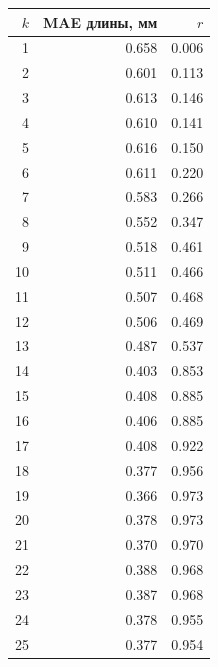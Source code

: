 \begin{tabular}{@{}rrr@{}}
\toprule
$k$ & MAE длины, мм & $r$ \\
\midrule
1 & \num{0.658} & \num{0.006} \\
2 & \num{0.601} & \num{0.113} \\
3 & \num{0.613} & \num{0.146} \\
4 & \num{0.610} & \num{0.141} \\
5 & \num{0.616} & \num{0.150} \\
6 & \num{0.611} & \num{0.220} \\
7 & \num{0.583} & \num{0.266} \\
8 & \num{0.552} & \num{0.347} \\
9 & \num{0.518} & \num{0.461} \\
10 & \num{0.511} & \num{0.466} \\
11 & \num{0.507} & \num{0.468} \\
12 & \num{0.506} & \num{0.469} \\
13 & \num{0.487} & \num{0.537} \\
14 & \num{0.403} & \num{0.853} \\
15 & \num{0.408} & \num{0.885} \\
16 & \num{0.406} & \num{0.885} \\
17 & \num{0.408} & \num{0.922} \\
18 & \num{0.377} & \num{0.956} \\
19 & \num{0.366} & \num{0.973} \\
20 & \num{0.378} & \num{0.973} \\
21 & \num{0.370} & \num{0.970} \\
22 & \num{0.388} & \num{0.968} \\
23 & \num{0.387} & \num{0.968} \\
24 & \num{0.378} & \num{0.955} \\
25 & \num{0.377} & \num{0.954} \\
\bottomrule
\end{tabular}

